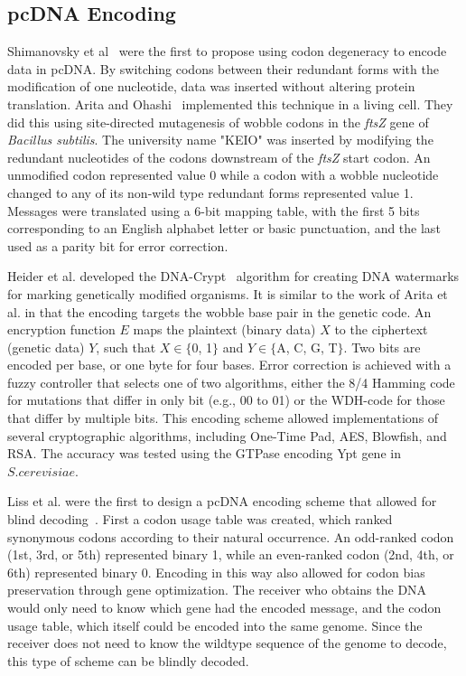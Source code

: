 \documentclass{bioinfo}
\begin{document}
\subsection{pcDNA Encoding}

Shimanovsky et al~\cite{SFHC2003BL} were the first to propose using codon degeneracy to encode data in pcDNA. By switching codons between their redundant forms with the modification of one nucleotide, data was inserted without altering protein translation. Arita and Ohashi~\cite{AY2004BP} implemented this technique in a living cell. They did this using site-directed mutagenesis of wobble codons in the \textit{ftsZ} gene of \textit{Bacillus subtilis}. The university name "KEIO" was inserted by modifying the redundant nucleotides of the codons downstream of the \textit{ftsZ} start codon. An unmodified codon represented value 0 while a codon with a wobble nucleotide changed to any of its non-wild type redundant forms represented value 1. Messages were translated using a 6-bit mapping table, with the first 5 bits corresponding to an English alphabet letter or basic punctuation, and the last used as a parity bit for error correction.

Heider et al. developed the DNA-Crypt~\cite{HBBMC2007} algorithm for creating DNA watermarks for marking genetically modified organisms. It is similar to the work of Arita et al. in that the encoding targets the wobble base pair in the genetic code. An encryption function $E$ maps the plaintext (binary data) $X$ to the ciphertext (genetic data) $Y$, such that $X \in  \{$0, 1$\}$ and $Y \in \{$A, C, G, T$\}$. Two bits are encoded per base, or one byte for four bases. Error correction is achieved with a fuzzy controller that selects one of two algorithms, either the 8/4 Hamming code for mutations that differ in only bit (e.g., 00 to 01) or the WDH-code for those that differ by multiple bits. This encoding scheme allowed implementations of several cryptographic algorithms, including One-Time Pad, AES, Blowfish, and RSA. The accuracy was tested using the GTPase encoding Ypt gene in $S. cerevisiae$.

Liss et al. were the first to design a pcDNA encoding scheme that allowed for blind decoding~\cite{LDBKHLW2012PO}. First a codon usage table was created, which ranked synonymous codons according to their natural occurrence. An odd-ranked codon (1st, 3rd, or 5th) represented binary 1, while an even-ranked codon (2nd, 4th, or 6th) represented binary 0. Encoding in this way also allowed for codon bias preservation through gene optimization. The receiver who obtains the DNA would only need to know which gene had the encoded message, and the codon usage table, which itself could be encoded into the same genome. Since the receiver does not need to know the wildtype sequence of the genome to decode, this type of scheme can be blindly decoded.
\end{document}
